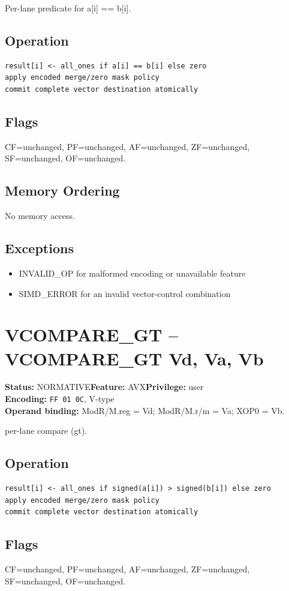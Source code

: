 \documentclass[10pt]{article}
\begin{document}
Per-lane predicate for a[i] == b[i].

\subsection*{Operation}
\begin{lstlisting}
result[i] <- all_ones if a[i] == b[i] else zero
apply encoded merge/zero mask policy
commit complete vector destination atomically
\end{lstlisting}
\subsection*{Flags}
CF=unchanged, PF=unchanged, AF=unchanged, ZF=unchanged, SF=unchanged, OF=unchanged.
\subsection*{Memory Ordering}
No memory access.
\subsection*{Exceptions}
\begin{itemize}
\item INVALID\_OP for malformed encoding or unavailable feature
\item SIMD\_ERROR for an invalid vector-control combination
\end{itemize}
\clearpage

\section{VCOMPARE\_GT -- VCOMPARE\_GT Vd, Va, Vb}
\textbf{Status:} NORMATIVE\quad \textbf{Feature:} AVX\quad \textbf{Privilege:} user\\
\textbf{Encoding:} \texttt{FF 01 0C}, V-type\\
\textbf{Operand binding:} ModR/M.reg = Vd; ModR/M.r/m = Va; XOP0 = Vb.

per-lane compare (gt).

\subsection*{Operation}
\begin{lstlisting}
result[i] <- all_ones if signed(a[i]) > signed(b[i]) else zero
apply encoded merge/zero mask policy
commit complete vector destination atomically
\end{lstlisting}
\subsection*{Flags}
CF=unchanged, PF=unchanged, AF=unchanged, ZF=unchanged, SF=unchanged, OF=unchanged.
\end{document}
